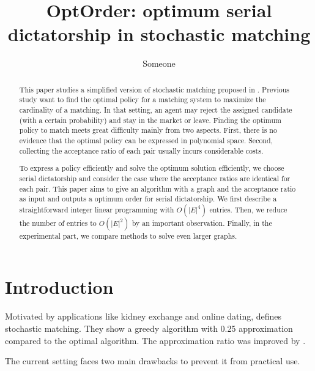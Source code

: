 \documentclass[letterpaper]{article}
\title {OptOrder: optimum serial dictatorship in stochastic matching}
\author {Someone}
\begin{document}
%

\maketitle
\begin{abstract}
This paper studies a simplified version of stochastic matching proposed in \cite{chen2009approximating}.
Previous study want to find the optimal policy for a matching system to maximize the cardinality of a matching.
In that setting, an agent may reject the assigned candidate (with a certain probability) and stay in the market or leave.
Finding the optimum policy to match meets great difficulty mainly from two aspects.
First, there is no evidence that the optimal policy can be expressed in polynomial space.
Second, collecting the acceptance ratio of each pair usually incurs considerable costs.

To express a policy efficiently and solve the optimum solution efficiently, we choose serial dictatorship and consider the case where the acceptance ratios are identical for each pair.
This paper aims to give an algorithm with a graph and the acceptance ratio as input and outputs a optimum order for serial dictatorship.
We first describe a straightforward integer linear programming with $O(|E|^4)$ entries.
Then, we reduce the number of entries to $O(|E|^2)$ by an important observation.
Finally, in the experimental part, we compare methods to solve even larger graphs.

\end{abstract}

\section{Introduction}

Motivated by applications like kidney exchange and online dating, \cite{chen2009approximating} defines stochastic matching.
They show a greedy algorithm with 0.25 approximation compared to the optimal algorithm.
The approximation ratio was improved by \cite{adamczyk2011improved,costello2012stochastic}.
\cite{goel2012matching} 
\cite{feldman2009online}

The current setting faces two main drawbacks to prevent it from practical use.
\end{document}
